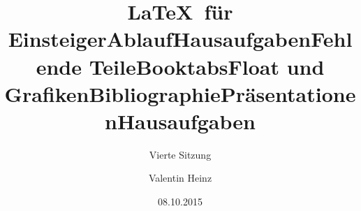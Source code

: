 \documentclass[]{beamer}
\date{}
\author{Valentin Heinz}
\title{\LaTeX \ für Einsteiger}
\date{08.10.2015}
\subtitle{Vierte Sitzung}
\begin{document}
\maketitle

\title{Ablauf}


\title{Hausaufgaben}


\title{Fehlende Teile}


\title{Booktabs}


\title{Float und Grafiken}


%

\title{Bibliographie}


\title{Präsentationen}


\title{Hausaufgaben}

\end{document}
